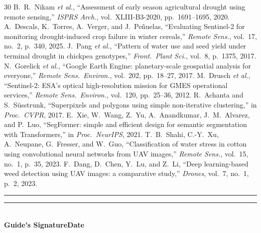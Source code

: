 \documentclass[11pt,a4paper,oneside]{article}
\begin{document}
\begin{thebibliography}{30}
 B.~R.~Nikam \textit{et al.}, ``Assessment of early season agricultural drought using remote sensing,'' \textit{ISPRS Arch.}, vol.~XLIII-B3-2020, pp.~1691--1695, 2020.
 A.~Descals, K.~Torres, A.~Verger, and J.~Pe\~{n}uelas, ``Evaluating Sentinel-2 for monitoring drought-induced crop failure in winter cereals,'' \textit{Remote Sens.}, vol.~17, no.~2, p.~340, 2025.
 J.~Pang \textit{et al.}, ``Pattern of water use and seed yield under terminal drought in chickpea genotypes,'' \textit{Front.\ Plant Sci.}, vol.~8, p.~1375, 2017.
 N.~Gorelick \textit{et al.}, ``Google Earth Engine: planetary-scale geospatial analysis for everyone,'' \textit{Remote Sens.\ Environ.}, vol.~202, pp.~18--27, 2017.
 M.~Drusch \textit{et al.}, ``Sentinel-2: ESA's optical high-resolution mission for GMES operational services,'' \textit{Remote Sens.\ Environ.}, vol.~120, pp.~25--36, 2012.
 R.~Achanta and S.~S\"{u}sstrunk, ``Superpixels and polygons using simple non-iterative clustering,'' in \textit{Proc.\ CVPR}, 2017.
 E.~Xie, W.~Wang, Z.~Yu, A.~Anandkumar, J.~M.~Alvarez, and P.~Luo, ``SegFormer: simple and efficient design for semantic segmentation with Transformers,'' in \textit{Proc.\ NeurIPS}, 2021.
 T.~B.~Shahi, C.-Y.~Xu, A.~Neupane, G.~Fresser, and W.~Guo, ``Classification of water stress in cotton using convolutional neural networks from UAV images,'' \textit{Remote Sens.}, vol.~15, no.~1, p.~35, 2023.
 F.~Dang, D.~Chen, Y.~Lu, and Z.~Li, ``Deep learning-based weed detection using UAV images: a comparative study,'' \textit{Drones}, vol.~7, no.~1, p.~2, 2023.
\end{thebibliography}
\endgroup

\vspace{8pt}
\noindent\rule{0.38\textwidth}{0.4pt}\hfill\rule{0.28\textwidth}{0.4pt}\\[2pt]
\noindent\textbf{Guide's Signature}\hfill\textbf{Date}
\end{document}
